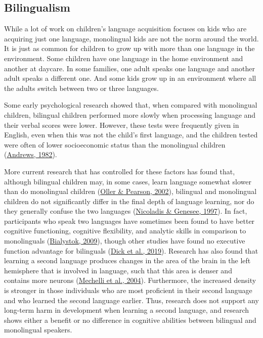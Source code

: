 \documentclass[
]{krantz}
\begin{document}
\hypertarget{bilingualism}{%
\subsection*{Bilingualism}\label{bilingualism}}


While a lot of work on children's language acquisition focuses on kids who are acquiring just one language, monolingual kids are not the norm around the world. It is just as common for children to grow up with more than one language in the environment. Some children have one language in the home environment and another at daycare. In some families, one adult speaks one language and another adult speaks a different one. And some kids grow up in an environment where all the adults switch between two or three languages.

Some early psychological research showed that, when compared with monolingual children, bilingual children performed more slowly when processing language and their verbal scores were lower. However, these tests were frequently given in English, even when this was not the child's first language, and the children tested were often of lower socioeconomic status than the monolingual children (\protect\hyperlink{ref-Andrews1982}{Andrews, 1982}).

More current research that has controlled for these factors has found that, although bilingual children may, in some cases, learn language somewhat slower than do monolingual children (\protect\hyperlink{ref-Oller2002}{Oller \& Pearson, 2002}), bilingual and monolingual children do not significantly differ in the final depth of language learning, nor do they generally confuse the two languages (\protect\hyperlink{ref-Nicoladis1997}{Nicoladis \& Genesee, 1997}). In fact, participants who speak two languages have sometimes been found to have better cognitive functioning, cognitive flexibility, and analytic skills in comparison to monolinguals (\protect\hyperlink{ref-Bialystok2009}{Bialystok, 2009}), though other studies have found no executive function advantage for bilinguals (\protect\hyperlink{ref-dick2019no}{Dick et al., 2019}). Research has also found that learning a second language produces changes in the area of the brain in the left hemisphere that is involved in language, such that this area is denser and contains more neurons (\protect\hyperlink{ref-Mechelli2004}{Mechelli et al., 2004}). Furthermore, the increased density is stronger in those individuals who are most proficient in their second language and who learned the second language earlier. Thus, research does not support any long-term harm in development when learning a second language, and research shows either a benefit or no difference in cognitive abilities between bilingual and monolingual speakers.
\end{document}

